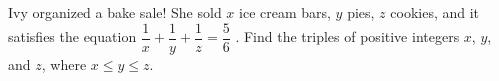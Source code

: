 Ivy organized a bake sale! She sold $x$ ice cream bars, $y$ pies, $z$ cookies, and it satisfies the equation $\dfrac{1}{x} + \dfrac{1}{y} + \dfrac{1}{z} = \dfrac{5}{6}$ . Find the triples of positive integers $x$, $y$, and $z$, where $x \le y \le z$.
